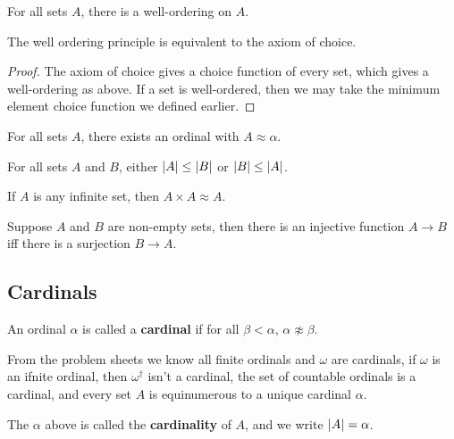 \documentclass{article}
\begin{document}
\begin{axiom}
    For all sets $A$, there is a well-ordering on $A$.
\end{axiom}

\begin{corollary}[ZF]
    The well ordering principle is equivalent to the axiom of choice.
    \begin{proof}
        The axiom of choice gives a choice function of every set, which gives a well-ordering as above. If a set is well-ordered, then we may take the minimum element choice function we defined earlier.
    \end{proof}
\end{corollary}

\begin{corollary}[ZFC]
    For all sets $A$, there exists an ordinal with $A\approx \alpha$.
\end{corollary}

\begin{corollary}[ZFC]
    For all sets $A$ and $B$, either $\left| A \right|\leq \left| B \right|$ or $\left| B \right|\leq \left| A \right|$.
\end{corollary}

\begin{corollary}[ZFC]
    If $A$ is any infinite set, then $A\times A \approx A$.
\end{corollary}

\begin{lemma}[ZFC]
    Suppose $A$ and $B$ are non-empty sets, then there is an injective function $A\rightarrow B$ iff there is a surjection $B\rightarrow A$.
\end{lemma}

\subsection{Cardinals}

\begin{definition}
    An ordinal $\alpha$ is called a \textbf{cardinal} if for all $\beta <\alpha$, $\alpha\not\approx \beta$.
\end{definition}

From the problem sheets we know all finite ordinals and $\omega$ are cardinals, if $\omega$ is an ifnite ordinal, then $\omega^\dagger$ isn't a cardinal, the set of countable ordinals is a cardinal, and every set $A$ is equinumerous to a unique cardinal $\alpha$.

\begin{definition}
    The $\alpha$ above is called the \textbf{cardinality} of $A$, and we write $\left| A \right| = \alpha$.
\end{definition}
\end{document}
